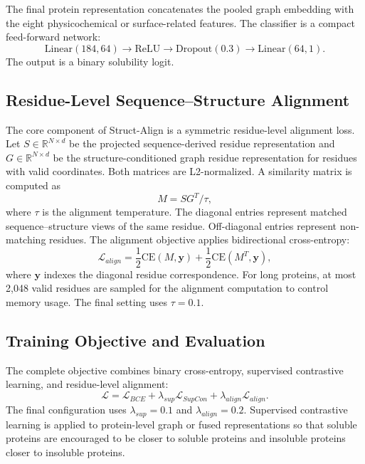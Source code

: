 \documentclass[conference]{IEEEtran}
\begin{document}
The final protein representation concatenates the pooled graph embedding with the eight physicochemical or surface-related features. The classifier is a compact feed-forward network:
\begin{equation}
\mathrm{Linear}(184,64) \rightarrow \mathrm{ReLU} \rightarrow \mathrm{Dropout}(0.3) \rightarrow \mathrm{Linear}(64,1).
\end{equation}
The output is a binary solubility logit.

\subsection{Residue-Level Sequence--Structure Alignment}
The core component of Struct-Align is a symmetric residue-level alignment loss. Let $S \in \mathbb{R}^{N \times d}$ be the projected sequence-derived residue representation and $G \in \mathbb{R}^{N \times d}$ be the structure-conditioned graph residue representation for residues with valid coordinates. Both matrices are L2-normalized. A similarity matrix is computed as
\begin{equation}
M = S G^{T}/\tau,
\end{equation}
where $\tau$ is the alignment temperature. The diagonal entries represent matched sequence--structure views of the same residue. Off-diagonal entries represent non-matching residues. The alignment objective applies bidirectional cross-entropy:
\begin{equation}
\mathcal{L}_{align} = \frac{1}{2}\mathrm{CE}(M,\mathbf{y}) + \frac{1}{2}\mathrm{CE}(M^T,\mathbf{y}),
\end{equation}
where $\mathbf{y}$ indexes the diagonal residue correspondence. For long proteins, at most 2,048 valid residues are sampled for the alignment computation to control memory usage. The final setting uses $\tau=0.1$.

\subsection{Training Objective and Evaluation}
The complete objective combines binary cross-entropy, supervised contrastive learning, and residue-level alignment:
\begin{equation}
\mathcal{L} = \mathcal{L}_{BCE} + \lambda_{sup}\mathcal{L}_{SupCon} + \lambda_{align}\mathcal{L}_{align}.
\end{equation}
The final configuration uses $\lambda_{sup}=0.1$ and $\lambda_{align}=0.2$. Supervised contrastive learning is applied to protein-level graph or fused representations so that soluble proteins are encouraged to be closer to soluble proteins and insoluble proteins closer to insoluble proteins.
\end{document}
